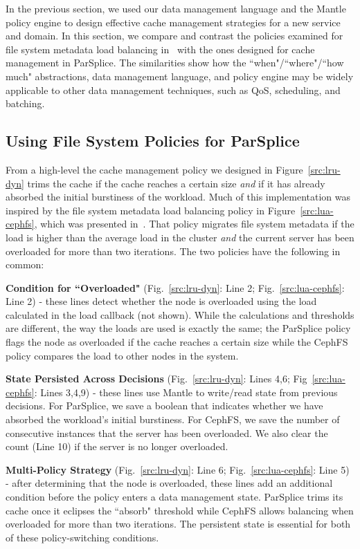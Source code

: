 In the previous section, we used our data management language and the Mantle
policy engine to design effective cache management strategies for a new service
and domain. In this section, we compare and contrast the policies examined for
file system metadata load balancing in~\cite{sevilla:sc15-mantle} with the ones
designed for cache management in ParSplice. The similarities show how the
``when"/``where"/``how much" abstractions, data management language, and policy
engine may be widely applicable to other data management techniques, such as
QoS, scheduling, and batching.

\subsection{Using File System Policies for ParSplice}

From a high-level the cache management policy we designed in
Figure~\ref{src:lru-dyn} trims the cache if the cache reaches a certain size
{\it and} if it has already absorbed the initial burstiness of the workload.
Much of this implementation was inspired by the file system metadata load
balancing policy in Figure~\ref{src:lua-cephfs}, which was presented
in~\cite{sevilla:sc15-mantle}. That policy migrates file system metadata if the
load is higher than the average load in the cluster {\it and} the current
server has been overloaded for more than two iterations. The two policies have
the following in common:

\textbf{Condition for ``Overloaded"} (Fig.~\ref{src:lru-dyn}: Line 2;
Fig.~\ref{src:lua-cephfs}: Line 2) - these lines detect whether the node is
overloaded using the load calculated in the load callback (not shown). While
the calculations and thresholds are different, the way the loads are used is
exactly the same; the ParSplice policy flags the node as overloaded if the
cache reaches a certain size while the CephFS policy compares the load to other
nodes in the system.

\textbf{State Persisted Across Decisions} (Fig.~\ref{src:lru-dyn}: Lines 4,6;
Fig~\ref{src:lua-cephfs}: Lines 3,4,9) - these lines use Mantle to write/read state
from previous decisions.  For ParSplice, we save a boolean that indicates
whether we have absorbed the workload's initial burstiness. For CephFS, we save
the number of consecutive instances that the server has been overloaded. We
also clear the count (Line 10) if the server is no longer overloaded. 

\textbf{Multi-Policy Strategy} (Fig.~\ref{src:lru-dyn}: Line 6;
Fig.~\ref{src:lua-cephfs}: Line 5) - after determining that the node is
overloaded, these lines add an additional condition before the policy enters a
data management state.  ParSplice trims its cache once it eclipses the
``absorb" threshold while CephFS allows balancing when overloaded for more than
two iterations. The persistent state is essential for both of these
policy-switching conditions.


